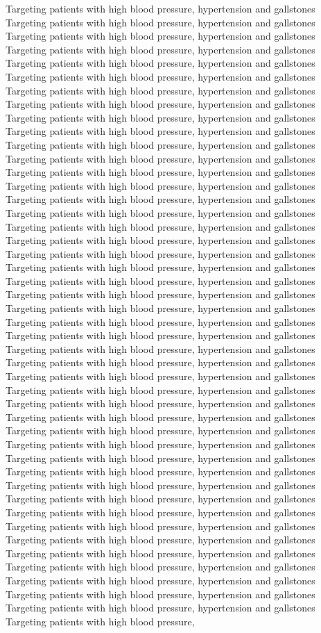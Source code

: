 \documentclass{article}%
\begin{document}
Targeting patients with high blood pressure, hypertension and gallstones Targeting patients with high blood pressure, hypertension and gallstones Targeting patients with high blood pressure, hypertension and gallstones Targeting patients with high blood pressure, hypertension and gallstones Targeting patients with high blood pressure, hypertension and gallstones Targeting patients with high blood pressure, hypertension and gallstones Targeting patients with high blood pressure, hypertension and gallstones Targeting patients with high blood pressure, hypertension and gallstones Targeting patients with high blood pressure, hypertension and gallstones Targeting patients with high blood pressure, hypertension and gallstones Targeting patients with high blood pressure, hypertension and gallstones Targeting patients with high blood pressure, hypertension and gallstones Targeting patients with high blood pressure, hypertension and gallstones Targeting patients with high blood pressure, hypertension and gallstones Targeting patients with high blood pressure, hypertension and gallstones Targeting patients with high blood pressure, hypertension and gallstones Targeting patients with high blood pressure, hypertension and gallstones Targeting patients with high blood pressure, hypertension and gallstones Targeting patients with high blood pressure, hypertension and gallstones Targeting patients with high blood pressure, hypertension and gallstones Targeting patients with high blood pressure, hypertension and gallstones Targeting patients with high blood pressure, hypertension and gallstones Targeting patients with high blood pressure, hypertension and gallstones Targeting patients with high blood pressure, hypertension and gallstones Targeting patients with high blood pressure, hypertension and gallstones Targeting patients with high blood pressure, hypertension and gallstones Targeting patients with high blood pressure, hypertension and gallstones Targeting patients with high blood pressure, hypertension and gallstones Targeting patients with high blood pressure, hypertension and gallstones Targeting patients with high blood pressure, hypertension and gallstones Targeting patients with high blood pressure, hypertension and gallstones Targeting patients with high blood pressure, hypertension and gallstones Targeting patients with high blood pressure, hypertension and gallstones Targeting patients with high blood pressure, hypertension and gallstones Targeting patients with high blood pressure, hypertension and gallstones Targeting patients with high blood pressure, hypertension and gallstones Targeting patients with high blood pressure, hypertension and gallstones Targeting patients with high blood pressure, hypertension and gallstones Targeting patients with high blood pressure, hypertension and gallstones Targeting patients with high blood pressure, hypertension and gallstones Targeting patients with high blood pressure, hypertension and gallstones Targeting patients with high blood pressure, hypertension and gallstones Targeting patients with high blood pressure, hypertension and gallstones Targeting patients with high blood pressure, hypertension and gallstones Targeting patients with high blood pressure, hypertension and gallstones Targeting patients with high blood pressure, 
\end{document}
